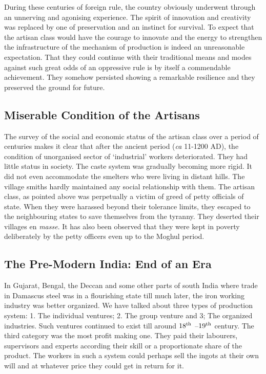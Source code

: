 During these centuries of foreign rule, the country obviously underwent through an unnerving and agonising experience. The spirit of innovation and creativity was replaced by one of preservation and an instinct for survival. To expect that the artisan class would have the courage to innovate and the energy to strengthen the infrastructure of the mechanism of production is indeed an unreasonable expectation. That they could continue with their traditional means and modes against such great odds of an oppressive rule is by itself a commendable achievement. They somehow persisted showing a remarkable resilience and they preserved the ground for future.  

\vspace{-.3cm}

\subsection*{Miserable Condition of the Artisans}\label{chapter8-subsection-4}

\vspace{-.2cm}

The survey of the social and economic status of the artisan class over a period of centuries makes it clear that after the ancient period ({\it ca} 11-1200 AD), the condition of unorganised sector of `industrial' workers deteriorated. They had little status in society. The caste system was gradually becoming more rigid. It did not even accommodate the smelters who were living in distant hills. The village smiths hardly maintained any social relationship with them. The artisan class, as pointed above was perpetually a victim of greed of petty officials of state. When they were harassed beyond their tolerance limits, they escaped to the neighbouring states to save themselves from the tyranny. They deserted their villages en {\it masse}. It has also been observed that they were kept in poverty deliberately by the petty officers even up to the Moghul period.

\vspace{-.3cm}

\subsection*{The Pre-Modern India: End of an Era}\label{chapter8-subsection-5}

\vspace{-.2cm}

In Gujarat, Bengal, the Deccan and some other parts of south India where trade in Damascus steel was in a flourishing state till much later, the iron working industry was better organized. We have talked about three types of production system: 1. The individual ventures; 2. The group venture and 3; The organized industries. Such ventures continued to exist till around $18^{\rm th}$ –$19^{\rm th}$ century. The third category was the most profit making one. They paid their labourers, supervisors and experts according their skill or a proportionate share of the product. The workers in such a system could perhaps sell the ingots at their own will and at whatever price they could get in return for it. 

